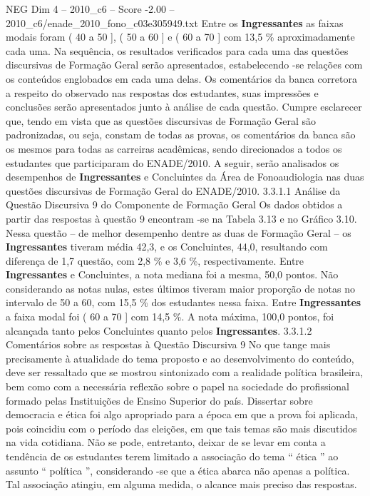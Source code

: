 \begin{textsample}{NEG Dim 4 – 2010\_c6 – Score -2.00 – 2010\_c6/enade\_2010\_fono\_c03e305949.txt}
Entre os \textbf{Ingressantes} as faixas modais foram ( 40 a 50 ], ( 50 a 60 ] e ( 60 a 70 ] com 13,5 \% aproximadamente cada uma.
Na sequência, os resultados verificados para cada uma das questões discursivas de Formação Geral serão apresentados, estabelecendo -se relações com os conteúdos englobados em cada uma delas.
Os comentários da banca corretora a respeito do observado nas respostas dos estudantes, suas impressões e conclusões serão apresentados junto à análise de cada questão.
Cumpre esclarecer que, tendo em vista que as questões discursivas de Formação Geral são padronizadas, ou seja, constam de todas as provas, os comentários da banca são os mesmos para todas as carreiras acadêmicas, sendo direcionados a todos os estudantes que participaram do ENADE/2010.
A seguir, serão analisados os desempenhos de \textbf{Ingressantes} e Concluintes da Área de Fonoaudiologia nas duas questões discursivas de Formação Geral do ENADE/2010. 3.3.1.1 Análise da Questão Discursiva 9 do Componente de Formação Geral Os dados obtidos a partir das respostas à questão 9 encontram -se na Tabela 3.13 e no Gráfico 3.10.
Nessa questão – de melhor desempenho dentre as duas de Formação Geral – os \textbf{Ingressantes} tiveram média 42,3, e os Concluintes, 44,0, resultando com diferença de 1,7 questão, com 2,8 \% e 3,6 \%, respectivamente.
Entre \textbf{Ingressantes} e Concluintes, a nota mediana foi a mesma, 50,0 pontos.
Não considerando as notas nulas, estes últimos tiveram maior proporção de notas no intervalo de 50 a 60, com 15,5 \% dos estudantes nessa faixa.
Entre \textbf{Ingressantes} a faixa modal foi ( 60 a 70 ] com 14,5 \%.
A nota máxima, 100,0 pontos, foi alcançada tanto pelos Concluintes quanto pelos \textbf{Ingressantes}. 3.3.1.2 Comentários sobre as respostas à Questão Discursiva 9 No que tange mais precisamente à atualidade do tema proposto e ao desenvolvimento do conteúdo, deve ser ressaltado que se mostrou sintonizado com a realidade política brasileira, bem como com a necessária reflexão sobre o papel na sociedade do profissional formado pelas Instituições de Ensino Superior do país.
Dissertar sobre democracia e ética foi algo apropriado para a época em que a prova foi aplicada, pois coincidiu com o período das eleições, em que tais temas são mais discutidos na vida cotidiana.
Não se pode, entretanto, deixar de se levar em conta a tendência de os estudantes terem limitado a associação do tema “ ética ” ao assunto “ política ”, considerando -se que a ética abarca não apenas a política.
Tal associação atingiu, em alguma medida, o alcance mais preciso das respostas.

\end{textsample}

